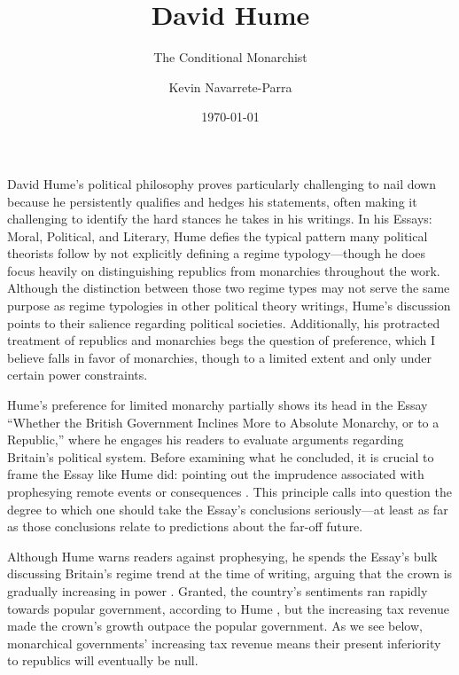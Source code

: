 \documentclass[authordate]{turabian-researchpaper}
\title{David Hume}
\subtitle{The Conditional Monarchist}
\author{Kevin Navarrete-Parra}
\date{\today}
\begin{document}
\maketitle




David Hume’s political philosophy proves particularly challenging to nail down because he persistently qualifies and hedges his statements, often making it challenging to identify the hard stances he takes in his writings. In his Essays: Moral, Political, and Literary, Hume defies the typical pattern many political theorists follow by not explicitly defining a regime typology—though he does focus heavily on distinguishing republics from monarchies throughout the work. Although the distinction between those two regime types may not serve the same purpose as regime typologies in other political theory writings, Hume’s discussion points to their salience regarding political societies. Additionally, his protracted treatment of republics and monarchies begs the question of preference, which I believe falls in favor of monarchies, though to a limited extent and only under certain power constraints. 

Hume’s preference for limited monarchy partially shows its head in the Essay “Whether the British Government Inclines More to Absolute Monarchy, or to a Republic,” where he engages his readers to evaluate arguments regarding Britain’s political system. Before examining what he concluded, it is crucial to frame the Essay like Hume did: pointing out the imprudence associated with prophesying remote events or consequences \autocite[47]{Hume_1985}. This principle calls into question the degree to which one should take the Essay’s conclusions seriously—at least as far as those conclusions relate to predictions about the far-off future. 

Although Hume warns readers against prophesying, he spends the Essay’s bulk discussing Britain’s regime trend at the time of writing, arguing that the crown is gradually increasing in power \autocite[51]{Hume_1985}. Granted, the country’s sentiments ran rapidly towards popular government, according to Hume \autocite[51]{Hume_1985}, but the increasing tax revenue made the crown’s growth outpace the popular government. As we see below, monarchical governments’ increasing tax revenue means their present inferiority to republics will eventually be null. 
\end{document}
